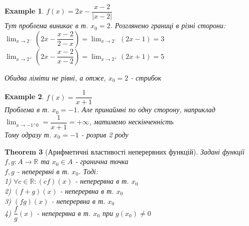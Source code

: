 \documentclass[a4paper, 14pt]{extarticle}
\def\huge{\displaystyle}
\theoremstyle{theoremdd}
\newtheorem{theorem}{Theorem}[subsection]
\theoremstyle{theoremdd}
\theoremstyle{theoremdd}
\theoremstyle{theoremdd}
\newtheorem{example}[theorem]{Example}
\theoremstyle{theoremdd}
\theoremstyle{theoremdd}
\theoremstyle{theoremdd}
\theoremstyle{theoremdd}
\begin{document}
\begin{example}
$f(x) = 2x - \dfrac{x-2}{|x-2|}$\\
Тут проблема виникає в т. $x_0 = 2$. Розглянемо границі в різні сторони:\\
$\huge \lim_{x \to 2^-} \left(2x - \dfrac{x-2}{2-x}\right) = \lim_{x \to 2^-} (2x-1) = 3$\\
$\huge \lim_{x \to 2^+} \left(2x - \dfrac{x-2}{x-2}\right) = \lim_{x \to 2^+} (2x+1) = 5$\\
\begin{figure}[H]
\centering
{
}
\end{figure}

Обидва ліміти не рівні, а отже, $x_0 = 2$ - стрибок
\end{example}

\begin{example}
$f(x) = \dfrac{1}{x+1}$\\
Проблема в т. $x_0 = -1$. Але принаймні по одну сторону, наприклад $\huge \lim_{x \to -1^+0} =\dfrac{1}{x+1} = +\infty$, матимемо нескінченність\\
Тому одразу т. $x_0 = -1$ - розрив 2 роду
\end{example}

\begin{theorem}[Арифметичні властивості неперервних функцій]
Задані функції $f,g: A \to \mathbb{R}$ та $x_0 \in A$ - гранична точка\\
$f,g$ - неперервні в т. $x_0$. Тоді:\\
1) $\forall c \in \mathbb{R}: (cf)(x)$ - неперервна в т. $x_0$\\
2) $(f+g)(x)$ - неперервна в т. $x_0$\\
3) $(fg)(x)$ - неперервна в т. $x_0$\\
4) $\dfrac{f}{g}(x)$ - неперервна в т. $x_0$ при $g(x_0) \neq 0$
\end{theorem}
\end{document}
